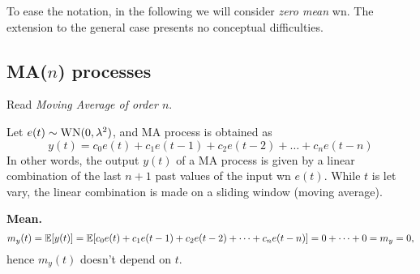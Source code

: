 To ease the notation, in the following we will consider \emph{zero mean} \gls{wn}. The extension to the general case presents no conceptual difficulties.

\subsection{MA(\texorpdfstring{$n$}{n}) processes}

Read \emph{Moving Average of order $n$}.

Let $e(t) \sim \operatorname{WN}(0, \lambda^{2})$, and MA process is obtained as
\[
	\boxed{y(t)=c_{0} e(t)+c_{1} e(t-1)+c_{2} e(t-2)+\ldots+c_{n} e(t-n)}
\]
In other words, the output $y(t)$ of a MA process is given by a linear combination of the last $n+1$ past values of the input \gls{wn} $e(t)$.
While $t$ is let vary, the linear combination is made on a sliding window (moving average).

\textbf{Mean.}
\[
	m_{y}(t)=\mathbb{E}[y(t)] = \mathbb{E}[c_{0} e(t)+c_{1} e(t-1)+c_{2} e(t-2)+\cdots+c_{n} e(t-n)] = 0+\cdots+0=m_{y}=0,
\]
hence $m_{y}(t)$ doesn't depend on $t$.

